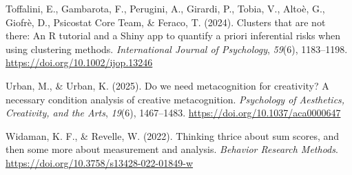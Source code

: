 \documentclass[
  man,
  longtable,
  nolmodern,
  notxfonts,
  notimes,
  colorlinks=true,linkcolor=blue,citecolor=blue,urlcolor=blue]{apa7}
\newlength{\cslhangindent}
\newenvironment{CSLReferences}[2] %
 {\begin{list}{}{%
  \setlength{\itemindent}{0pt}
  \setlength{\leftmargin}{0pt}
  \setlength{\parsep}{0pt}
  \ifodd #1
   \setlength{\leftmargin}{\cslhangindent}
   \setlength{\itemindent}{-1\cslhangindent}
  \fi
  \setlength{\itemsep}{#2\baselineskip}}}
 {\end{list}}
\begin{document}
\begin{CSLReferences}{1}{0}
Toffalini, E., Gambarota, F., Perugini, A., Girardi, P., Tobia, V.,
Altoè, G., Giofrè, D., Psicostat Core Team, \& Feraco, T. (2024).
Clusters that are not there: An R tutorial and a Shiny app to quantify a
priori inferential risks when using clustering methods.
\emph{International Journal of Psychology}, \emph{59}(6), 1183--1198.
\url{https://doi.org/10.1002/ijop.13246}

Urban, M., \& Urban, K. (2025). Do we need metacognition for creativity?
A necessary condition analysis of creative metacognition.
\emph{Psychology of Aesthetics, Creativity, and the Arts}, \emph{19}(6),
1467--1483. \url{https://doi.org/10.1037/aca0000647}

Widaman, K. F., \& Revelle, W. (2022). Thinking thrice about sum scores,
and then some more about measurement and analysis. \emph{Behavior
Research Methods}. \url{https://doi.org/10.3758/s13428-022-01849-w}

\end{CSLReferences}
\end{document}
